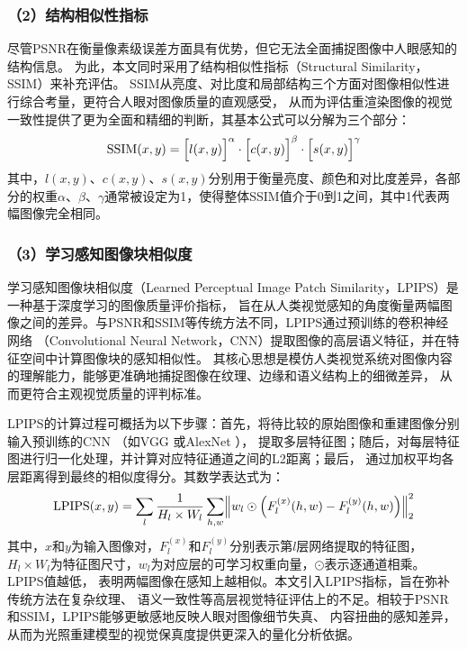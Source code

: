 \subsubsection*{（2）结构相似性指标} 

尽管PSNR在衡量像素级误差方面具有优势，但它无法全面捕捉图像中人眼感知的结构信息。
为此，本文同时采用了结构相似性指标（Structural Similarity，SSIM）来补充评估。
SSIM从亮度、对比度和局部结构三个方面对图像相似性进行综合考量，更符合人眼对图像质量的直观感受，
从而为评估重渲染图像的视觉一致性提供了更为全面和精细的判断，其基本公式可以分解为三个部分：
\begin{equation}\label{eq:SSIM}
\mathrm{SSIM}(x,y)=\Bigl[l(x,y)\Bigr]^\alpha\cdot\Bigl[c(x,y)\Bigr]^\beta\cdot\Bigl[s(x,y)\Bigr]^\gamma
\end{equation}
其中，$l(x,y)$、$c(x,y)$、$s(x,y)$分别用于衡量亮度、颜色和对比度差异，各部分的权重$\alpha$、$\beta$、$\gamma$通常被设定为1，使得整体SSIM值介于0到1之间，其中1代表两幅图像完全相同。

\subsubsection*{（3）学习感知图像块相似度} 

学习感知图像块相似度（Learned Perceptual Image Patch Similarity，LPIPS）是一种基于深度学习的图像质量评价指标，
旨在从人类视觉感知的角度衡量两幅图像之间的差异。与PSNR和SSIM等传统方法不同，LPIPS通过预训练的卷积神经网络
（Convolutional Neural Network，CNN）提取图像的高层语义特征，并在特征空间中计算图像块的感知相似性。
其核心思想是模仿人类视觉系统对图像内容的理解能力，能够更准确地捕捉图像在纹理、边缘和语义结构上的细微差异，
从而更符合主观视觉质量的评判标准。

LPIPS的计算过程可概括为以下步骤：首先，将待比较的原始图像和重建图像分别输入预训练的CNN
（如VGG \cite{journals/corr/SimonyanZ14a}或AlexNet \cite{NIPS2012_c399862d}），
提取多层特征图；随后，对每层特征图进行归一化处理，并计算对应特征通道之间的L2距离；最后，
通过加权平均各层距离得到最终的相似度得分。其数学表达式为：
\begin{equation}\label{eq:lpips}
  \mathrm{LPIPS}(x,y)=
  \sum_{l}\frac{1}{H_{l}\times W_{l}}
  \sum_{h,w} \Bigl \Vert w_{l} \odot \Bigl(F_{l}^{(x)}(h,w)-F_{l}^{(y)}(h,w) \Bigr) \Bigr \Vert_{2}^{2}
\end{equation}
其中，$x$和$y$为输入图像对，$F_{l}^{(x)}$和$F_{l}^{(y)}$分别表示第$l$层网络提取的特征图，
$H_{l}\times W_{l}$为特征图尺寸，$w_{l}$为对应层的可学习权重向量，$\odot$表示逐通道相乘。LPIPS值越低，
表明两幅图像在感知上越相似。本文引入LPIPS指标，旨在弥补传统方法在复杂纹理、
语义一致性等高层视觉特征评估上的不足。相较于PSNR和SSIM，LPIPS能够更敏感地反映人眼对图像细节失真、
内容扭曲的感知差异，从而为光照重建模型的视觉保真度提供更深入的量化分析依据。

